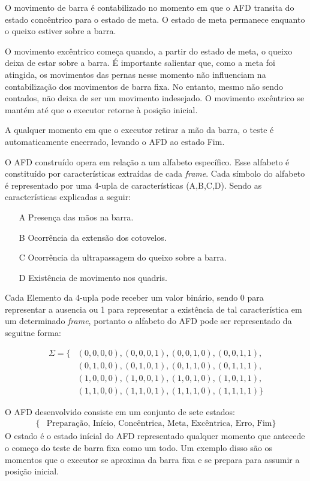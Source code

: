 O movimento de barra é contabilizado no momento em que o \ac{AFD} transita do estado concêntrico para o estado de meta. O estado de meta permanece enquanto o queixo estiver sobre a barra.

O movimento excêntrico começa quando, a partir do estado de meta, o queixo deixa de estar sobre a barra. É importante salientar que, como a meta foi atingida, os movimentos das pernas nesse momento não influenciam na contabilização dos movimentos de barra fixa. No entanto, mesmo não sendo contados, não deixa de ser um movimento indesejado. O movimento excêntrico se mantém até que o executor retorne à posição inicial.

A qualquer momento em que o executor retirar a mão da barra, o teste é automaticamente encerrado, levando o \ac{AFD} ao estado Fim.

O \ac{AFD} construído opera em relação a um alfabeto específico. Esse alfabeto é constituído por características extraídas de cada \textit{frame}. Cada símbolo do alfabeto é representado por uma 4-upla de características (A,B,C,D). Sendo as características explicadas a seguir:

\begin{itemize}
    \item[A] Presença das mãos na barra.
    \item[B] Ocorrência da extensão dos cotovelos.
    \item[C] Ocorrência da ultrapassagem do queixo sobre a barra.
    \item[D] Existência de movimento nos quadris.
\end{itemize} 

Cada Elemento da 4-upla pode receber um valor binário, sendo 0 para representar a ausencia  ou 1 para representar a existência de tal característica em um determinado \textit{frame}, portanto o alfabeto do \ac{AFD} pode ser representado da seguitne forma:


\[
\begin{aligned}
\Sigma = \{ &(0, 0, 0, 0), (0, 0, 0, 1), (0, 0, 1, 0), (0, 0, 1, 1), \\
            &(0, 1, 0, 0), (0, 1, 0, 1), (0, 1, 1, 0), (0, 1, 1, 1), \\
            &(1, 0, 0, 0), (1, 0, 0, 1), (1, 0, 1, 0), (1, 0, 1, 1), \\
            &(1, 1, 0, 0), (1, 1, 0, 1), (1, 1, 1, 0), (1, 1, 1, 1) \}
\end{aligned}
\]

O \ac{AFD} desenvolvido consiste em um conjunto de sete estados:
\[
\begin{aligned}
\{ &\text{Preparação, Início, Concêntrica, Meta, Excêntrica, Erro, Fim} \}
\end{aligned}
\]
O estado  é o estado inícial do \ac{AFD} representado qualquer momento que antecede o começo do teste de barra fixa como um todo. Um exemplo disso são os momentos que o executor se aproxima da barra fixa e se prepara para assumir a posição inicial.

